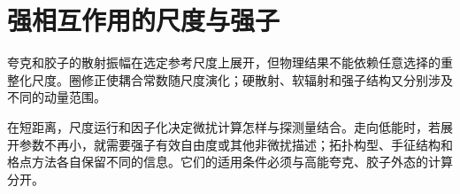 \chapter{强相互作用的尺度与强子}\label{chap:strong-coupling-and-hadrons}

夸克和胶子的散射振幅在选定参考尺度上展开，但物理结果不能依赖任意选择的重整化尺度。圈修正使耦合常数随尺度演化；硬散射、软辐射和强子结构又分别涉及不同的动量范围。

在短距离，尺度运行和因子化决定微扰计算怎样与探测量结合。走向低能时，若展开参数不再小，就需要强子有效自由度或其他非微扰描述；拓扑构型、手征结构和格点方法各自保留不同的信息。它们的适用条件必须与高能夸克、胶子外态的计算分开。






